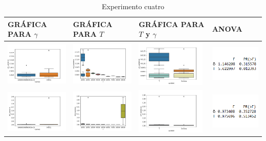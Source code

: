 \begin{table}[]
\caption{Experimento cuatro}
\centering
\begin{tabular}[c]{llll}
\multicolumn{1}{p{2.95cm}}{\textbf{GRÁFICA PARA $\gamma$}} & \multicolumn{1}{p{2.95cm}}{\textbf{GRÁFICA PARA $T$}} & \multicolumn{1}{p{2.95cm}}{\textbf{GRÁFICA PARA $T$ y $\gamma$}} & \multicolumn{1}{p{2.95cm}}{\textbf{ANOVA}}  \\ \hline
\multicolumn{1}{|l|}{\includegraphics[align=t, width=33mm]{cajasGamma_exp4.jpg}}    & \multicolumn{1}{l|}{\includegraphics[align=t, width=33mm]{cajasT_exp4.jpg} } & \multicolumn{1}{l|}{\includegraphics[align=t, width=33mm]{cajasT_Gamma_exp4.jpg} } &
\multicolumn{1}{p{3.2cm}|}{\includegraphics[align=t, width=30mm]{Anova4.png}}     \\ \hline
\multicolumn{1}{|l|}{\includegraphics[align=t, width=33mm]{cajasGamma_exp42.jpg}}    & \multicolumn{1}{l|}{\includegraphics[align=t, width=33mm]{cajasT_exp42.jpg} } & \multicolumn{1}{l|}{\includegraphics[align=t, width=33mm]{cajasT_Gamma_exp42.jpg} } & \multicolumn{1}{p{3.2cm}|}{\includegraphics[align=t, width=30mm]{Anova42.png}} \\ \hline

\end{tabular}
\end{table}
